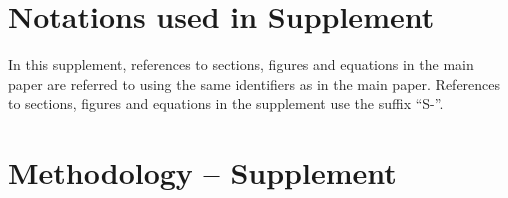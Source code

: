 \documentclass[12pt]{article}
\begin{document}
\renewcommand\thefigure{S-\arabic{figure}}
\renewcommand\thetable{S-\arabic{table}}
\renewcommand\thesection{S-\arabic{section}}
\renewcommand\thesubsection{S-\arabic{section}.\arabic{subsection}}
\renewcommand\theequation{S-\arabic{equation}}
\section{Notations used in Supplement}
In this supplement, references to sections, figures and equations in
the main paper are referred to using the same identifiers as in the
main paper. References to sections, figures and equations in the
supplement use the suffix ``S-''. 
\section{Methodology -- Supplement}
\end{document}
